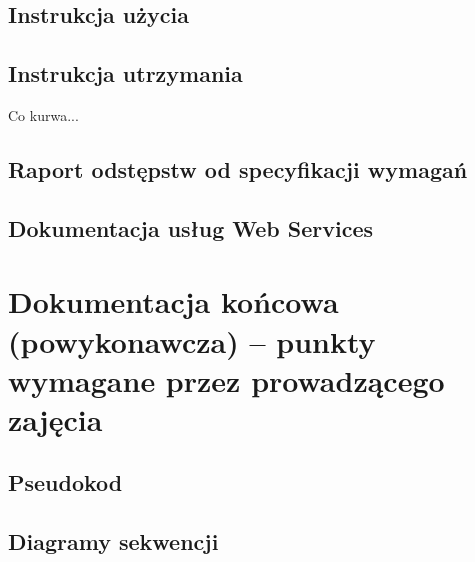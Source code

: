 \documentclass[10pt,a4paper]{article}
\begin{document}
\subsection{Instrukcja użycia}
%

\subsection{Instrukcja utrzymania}
Co kurwa...
%

\subsection{Raport odstępstw od specyfikacji wymagań}

\subsection{Dokumentacja usług Web Services}
%

\section{Dokumentacja końcowa (powykonawcza) -- punkty wymagane przez prowadzącego zajęcia}

\subsection{Pseudokod}

\subsection{Diagramy sekwencji}
%
\end{document}
